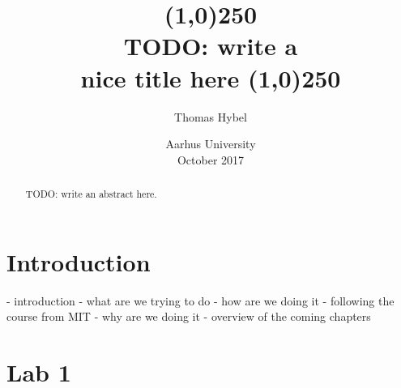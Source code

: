 \documentclass{article}
\title{
\line(1,0){250}\\
\Large \bfseries
TODO: write a \\
nice title here
\line(1,0){250}
}
\author{Thomas Hybel}
\date{Aarhus University \\ October 2017}
\begin{document}
\maketitle

\begin{abstract} 
\noindent 
TODO: write an abstract here.
\end{abstract}
\newpage

\tableofcontents
\newpage
{}




\section{Introduction}


- introduction
	- what are we trying to do
	- how are we doing it
		- following the course from MIT
	- why are we doing it
	- overview of the coming chapters










\section{Lab 1}
\end{document}
